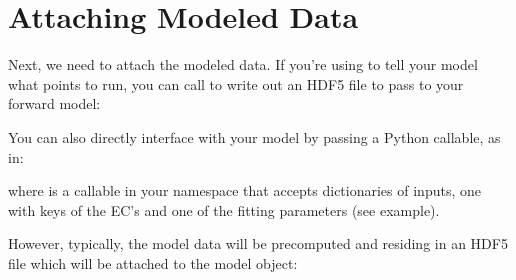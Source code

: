 \documentclass[letterpaper,10pt,english]{sphinxmanual}
\begin{document}
\section{Attaching Modeled Data}
\label{\detokenize{manual:attaching-modeled-data}}
Next, we need to attach the modeled data. If you’re using  to tell your model what points to run, you can call  to write out an HDF5 file to pass to your forward model:

%
\begin{sphinxVerbatim}[commandchars=\\\{\}]
\end{sphinxVerbatim}

You can also directly interface with your model by passing a Python callable, as in:

%
\begin{sphinxVerbatim}[commandchars=\\\{\}]
 
\end{sphinxVerbatim}

where  is a callable in your namespace that accepts dictionaries of inputs, one with keys of the EC’s and one of the fitting parameters (see {\hyperref[\detokenize{examples:id}]{}} example).

However, typically, the model data will be precomputed and residing in an HDF5 file which will be attached to the model object:

%
\begin{sphinxVerbatim}[commandchars=\\\{\}]
 
\end{sphinxVerbatim}
\end{document}
